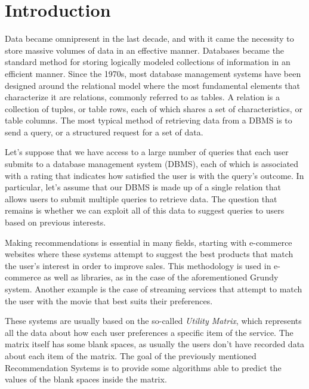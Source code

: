 \section{Introduction}

Data became omnipresent in the last decade, and with it came the necessity to store massive volumes of data in an effective manner. Databases became the standard method for storing logically modeled collections of information in an efficient manner. Since the 1970s, most database management systems have been designed around the relational model\cite{relational_model} where the most fundamental elements that characterize it are relations, commonly referred to as tables. A relation is a collection of tuples, or table rows, each of which shares a set of characteristics, or table columns. The most typical method of retrieving data from a DBMS is to send a query, or a structured request for a set of data. 

Let's suppose that we have access to a large number of queries that each user submits to a database management system (DBMS), each of which is associated with a rating that indicates how satisfied the user is with the query's outcome. In particular, let's assume that our DBMS is made up of a single relation that allows users to submit multiple queries to retrieve data. The question that remains is whether we can exploit all of this data to suggest queries to users based on previous interests. 

Making recommendations is essential in many fields, starting with e-commerce websites where these systems attempt to suggest the best products that match the user's interest in order to improve sales. This methodology is used in e-commerce as well as libraries, as in the case of the aforementioned Grundy system. Another example is the case of streaming services that attempt to match the user with the movie that best suits their preferences. 

These systems are usually based on the so-called \emph{Utility Matrix}, which represents all the data about how each user preferences a specific item of the service.
The matrix itself has some blank spaces, as usually the users don't have recorded data about each item of the matrix.
The goal of the previously mentioned Recommendation Systems is to provide some algorithms able to predict the values of the blank spaces inside the matrix.


